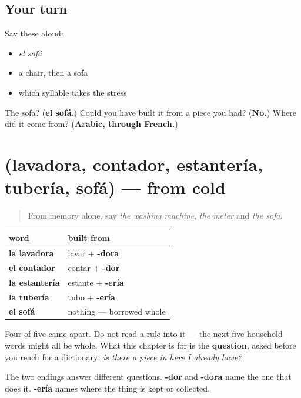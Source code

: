 \subsection*{Your turn}
Say these aloud:

\begin{itemize}
\raggedright
  \item \emph{el sofá}
  \item a chair, then a sofa
  \item which syllable takes the stress
\end{itemize}

\begin{tcolorbox}[breakable,colback=teal!4,colframe=teal!35!black,title={Before you move on}]
The sofa? (\textbf{el sofá}.) Could you have built it from a piece you had? (\textbf{No.}) Where did it come from? (\textbf{Arabic, through French.})
\end{tcolorbox}
\section[(lavadora, contador, estantería …]{(lavadora, contador, estantería, tubería, sofá) — from cold}

\label{lesson:ES-R432-repaso-casa}



\begin{quote}
From memory alone, say \emph{the washing machine}, \emph{the meter} and \emph{the sofa}.
\end{quote}

\begin{grammarlens}[title={Grammar Lens: two endings and one exception}]
\noindent
\begin{tabularx}{\linewidth}{@{}>{\raggedright\arraybackslash}X>{\raggedright\arraybackslash}X@{}}
\toprule
\textbf{word} & \textbf{built from} \\
\midrule
\textbf{la lavadora} & lavar + \textbf{-dora} \\
\textbf{el contador} & contar + \textbf{-dor} \\
\textbf{la estantería} & estante + \textbf{-ería} \\
\textbf{la tubería} & tubo + \textbf{-ería} \\
\textbf{el sofá} & nothing — borrowed whole \\
\bottomrule
\end{tabularx}

Four of five came apart. Do not read a rule into it — the next five household words might all be whole. What this chapter is for is the \textbf{question}, asked before you reach for a dictionary: \emph{is there a piece in here I already have?}

The two endings answer different questions. \textbf{-dor} and \textbf{-dora} name the one that does it. \textbf{-ería} names where the thing is kept or collected.
\end{grammarlens}

